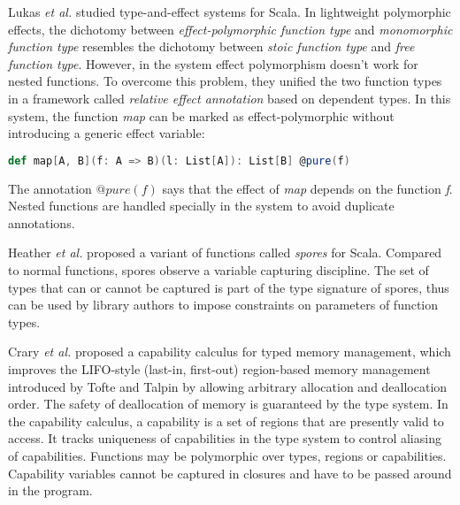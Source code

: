 Lukas \emph{et al.}  studied type-and-effect systems for
Scala\cite{rytz2012lightweight, rytz2013flow, lukas2014effect}.  In
lightweight polymorphic effects\cite{rytz2012lightweight}, the
dichotomy between \emph{effect-polymorphic function type} and
\emph{monomorphic function type} resembles the dichotomy between
\emph{stoic function type} and \emph{free function type}. However, in
the system effect polymorphism doesn't work for nested functions. To
overcome this problem, they unified the two function types in a
framework called \emph{relative effect annotation} based on dependent
types. In this system, the function \emph{map} can be marked as
effect-polymorphic without introducing a generic effect variable:

\begin{lstlisting}[language=Scala]
def map[A, B](f: A => B)(l: List[A]): List[B] @pure(f)
\end{lstlisting}

The annotation $@pure(f)$ says that the effect of \emph{map} depends
on the function \emph{f}. Nested functions are handled specially in
the system to avoid duplicate annotations.


Heather \emph{et al.} proposed a variant of functions called
\emph{spores} for Scala\cite{miller2014spores}. Compared to normal
functions, spores observe a variable capturing discipline. The set of
types that can or cannot be captured is part of the type signature of
spores, thus can be used by library authors to impose constraints on
parameters of function types.


Crary \emph{et al.} proposed a capability calculus for typed memory
management\cite{crary1999typed}, which improves the LIFO-style
(last-in, first-out) region-based memory management introduced by
Tofte and Talpin\cite{tofte1997region} by allowing arbitrary
allocation and deallocation order. The safety of deallocation of
memory is guaranteed by the type system. In the capability calculus, a
capability is a set of regions that are presently valid to access. It
tracks uniqueness of capabilities in the type system to control
aliasing of capabilities. Functions may be polymorphic over types,
regions or capabilities. Capability variables cannot be captured in
closures and have to be passed around in the program.

